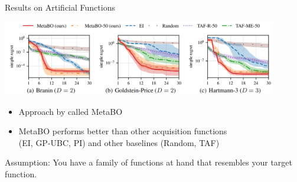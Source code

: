\begin{frame}[c]{Results on Artificial Functions }

\centering
\includegraphics[width=0.9\textwidth]{images/l2acq_results.png}

\medskip

\begin{itemize}
\item Approach by  called MetaBO
\item MetaBO performs better than other acquisition functions\\ (EI, GP-UBC, PI) and other baselines (Random, TAF)
\end{itemize}

\pause
\begin{flushleft}
\alert{Assumption}: You have a family of functions at hand that resembles your target function.	
\end{flushleft}


\end{frame}



